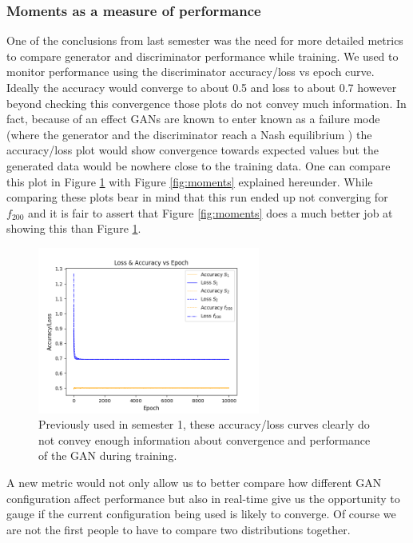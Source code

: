 \documentclass[11pt]{article} %
\begin{document}
\subsubsection{Moments as a measure of performance}
One of the conclusions from last semester was the need for more detailed metrics to compare generator and discriminator
performance while training.
We used to monitor performance using the discriminator accuracy/loss vs epoch curve.
Ideally the accuracy would converge to about 0.5 and loss to about 0.7 however beyond checking this convergence
those plots do not convey much information.
In fact, because of an effect GANs are known to enter known as a failure mode (where the generator and the discriminator
reach a Nash equilibrium \cite{salimans2016improved}) the accuracy/loss plot would
show convergence towards expected values but the generated data would be nowhere close to the training data.
One can compare this plot in Figure \ref{fig:acc_loss} with Figure \ref{fig:moments} explained hereunder.
While comparing these plots bear in mind that this run ended up not converging for $f_{200}$ and it is fair to assert that
Figure \ref{fig:moments} does a much better job at showing this than Figure \ref{fig:acc_loss}.
\begin{figure}[H]
\centering
\includegraphics[width=0.65\textwidth]{./images/performance.png}
\caption{Previously used in semester 1, these accuracy/loss curves clearly do not convey enough
information about convergence and performance of the GAN during training.}
\label{fig:acc_loss}
\end{figure}
\par
A new metric would not only allow us to better compare how different GAN configuration affect performance but also
in real-time give us the opportunity to gauge if the current configuration being used is likely to converge.
Of course we are not the first people to have to compare two distributions together.
\end{document}

